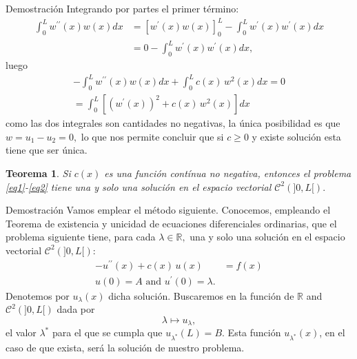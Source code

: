 \documentclass[10pt,handout]{beamer}
\theoremstyle{plain} %
\newtheorem{thm}{Teorema}
\theoremstyle{plain} %
\theoremstyle{plain} %
\theoremstyle{plain} %
\theoremstyle{definition}
\theoremstyle{example}
\theoremstyle{example}
\theoremstyle{remark}
\theoremstyle{remark}
\begin{document}
\begin{frame}{Demostración}
Integrando por partes el primer término:
\begin{align*}
\int_0^L w^{\prime \prime}(x) w(x) dx & = [w^{\prime}(x) w(x)]_0^L - \int_0^L w^{\prime}(x) w^{\prime}(x) dx \\ 
& = 0 - \int_0^L w^{\prime}(x) w^{\prime}(x) dx,
\end{align*}
luego
\begin{align*}
-\int_0^L w^{\prime \prime}(x) w(x) dx + \int_0^L c(x)\,w^2(x) dx  = 0 \\ 
= \int_0^L [(w^{\prime}(x))^2 + c(x)\,w^2(x)] dx 
\end{align*}
como las dos integrales son cantidades no negativas, la única posibilidad es que $w=u_1 -u_2 =0,$
lo que nos permite concluir que si $c \ge 0$ y existe solución esta tiene que ser única.
\end{frame}


\begin{frame}
\begin{thm}
Si $c(x)$ es una función contínua no negativa, entonces el problema \eqref{eq1}-\eqref{eq2} tiene una y solo una solución en el espacio vectorial $\mathcal{C}^2(]0,L[).$
\end{thm}
\end{frame}

\begin{frame}{Demostración}
Vamos emplear el método siguiente. Conocemos, empleando el Teorema de existencia y unicidad de ecuaciones diferenciales ordinarias, que el problema siguiente tiene, para cada $\lambda \in \mathbb{R},$ una y solo una 
solución en el espacio vectorial $\mathcal{C}^2(]0,L[):$ 
\begin{align}
- u^{\prime \prime}(x) + c(x)\,u(x) & = f(x) \label{ODE1} \\ 
 u(0) = A  \text{ and } u^{\prime}(0) = \lambda.  \label{ODE2}
\end{align}
Denotemos por $u_{\lambda}(x)$ dicha solución. Buscaremos en la función 
de $\mathbb{R}$ and $\mathcal{C}^2(]0,L[)$ dada por
$$
\lambda \mapsto u_{\lambda},
$$
el valor $\lambda^*$ para el que se cumpla que $u_{\lambda^*}(L) = B.$ Esta función $u_{\lambda^*}(x)$, en el caso de que exista, será la
solución de nuestro problema.
\end{frame}
\end{document}
